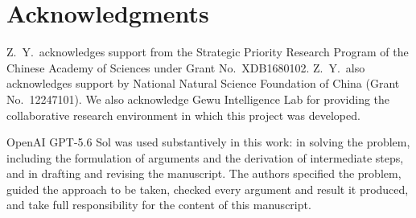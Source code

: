 \documentclass[11pt,reqno]{amsart}
\theoremstyle{plain}
\theoremstyle{definition}
\theoremstyle{remark}
\numberwithin{equation}{section}
\begin{document}
\section*{Acknowledgments}

Z.\ Y.\ acknowledges support from the Strategic Priority Research Program of the
Chinese Academy of Sciences under Grant No.~XDB1680102. Z.\ Y.\ also
acknowledges support by National Natural Science Foundation of China (Grant
No.~12247101). We also acknowledge Gewu Intelligence Lab for providing the
collaborative research environment in which this project was developed.

OpenAI GPT-5.6 Sol was used substantively in this work: in solving the
problem, including the formulation of arguments and the derivation of
intermediate steps, and in drafting and revising the manuscript. The
authors specified the problem, guided the approach to be taken, checked
every argument and result it produced, and take full responsibility for
the content of this manuscript.



\end{document}
